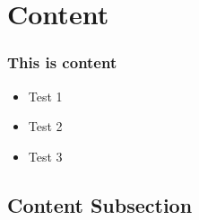 \documentclass[]{beamer}
\begin{document}
\section{Content}

\begin{frame}
    \frametitle{This is content}
    \begin{itemize}
        \item<1,2>Test 1
        \item<2>Test 2
        \item<3>Test 3
    \end{itemize}
\end{frame}

\subsection{Content Subsection}

\end{document}
